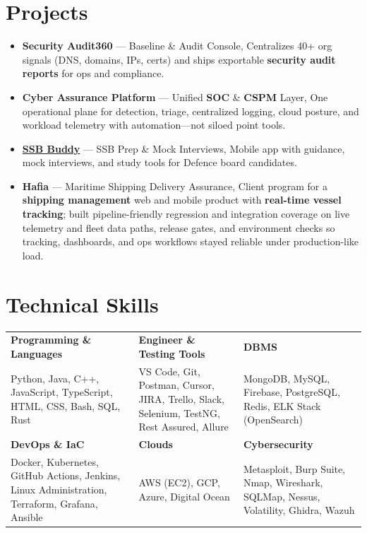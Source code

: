 \documentclass[a4paper,10pt]{article}
\newcommand{\resumeProjectHeading}[1]{%
  \item[]
    {\raggedright\small #1\par}\vspace{2pt}%
}
\newcommand{\resumeSubHeadingListStart}{\begin{itemize}[leftmargin=0pt, itemindent=0pt, label={}, labelwidth=0pt, labelsep=0pt]}
\newcommand{\resumeSubHeadingListEnd}{\end{itemize}}
\begin{document}
\section{Projects}
    \resumeSubHeadingListStart
      \resumeProjectHeading
          {\textbf{Security Audit360} --- Baseline \& Audit Console, Centralizes 40+ org signals (DNS, domains, IPs, certs) and ships exportable \textbf{security audit reports} for ops and compliance.}
      \resumeProjectHeading
          {\textbf{Cyber Assurance Platform} --- Unified \textbf{SOC} \& \textbf{CSPM} Layer, One operational plane for detection, triage, centralized logging, cloud posture, and workload telemetry with automation—not siloed point tools.}
      \resumeProjectHeading
          {\textbf{\href{https://ssb-buddy.neerajlovecyber.com/}{SSB Buddy}} --- SSB Prep \& Mock Interviews, Mobile app with guidance, mock interviews, and study tools for Defence board candidates.}
      \resumeProjectHeading
          {\textbf{Hafia} --- Maritime Shipping Delivery Assurance, Client program for a \textbf{shipping management} web and mobile product with \textbf{real-time vessel tracking}; built pipeline-friendly regression and integration coverage on live telemetry and fleet data paths, release gates, and environment checks so tracking, dashboards, and ops workflows stayed reliable under production-like load.}
    \resumeSubHeadingListEnd

\section{Technical Skills}
{\footnotesize
\setlength{\tabcolsep}{5pt}
\renewcommand{\arraystretch}{1.12}
\begin{tabularx}{\textwidth}{@{}>{\raggedright\arraybackslash}X>{\raggedright\arraybackslash}X>{\raggedright\arraybackslash}X@{}}
\textbf{Programming \& Languages} &
\textbf{Engineer \& Testing Tools} &
\textbf{DBMS} \\[2pt]
Python, Java, C++, JavaScript, TypeScript, HTML, CSS, Bash, SQL, Rust &
VS Code, Git, Postman, Cursor, JIRA, Trello, Slack, Selenium, TestNG, Rest Assured, Allure &
MongoDB, MySQL, Firebase, PostgreSQL, Redis, ELK Stack (OpenSearch) \\[7pt]
\textbf{DevOps \& IaC} &
\textbf{Clouds} &
\textbf{Cybersecurity} \\[2pt]
Docker, Kubernetes, GitHub Actions, Jenkins, Linux Administration, Terraform, Grafana, Ansible &
AWS (EC2), GCP, Azure, Digital Ocean &
Metasploit, Burp Suite, Nmap, Wireshark, SQLMap, Nessus, Volatility, Ghidra, Wazuh \\
\end{tabularx}
\par}
\end{document}
